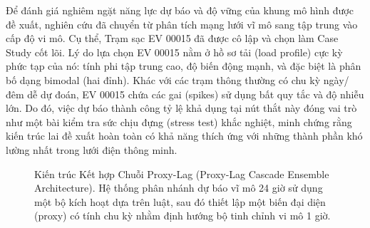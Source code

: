 \documentclass[pdflatex,sn-mathphys-num]{sn-jnl}%
\theoremstyle{thmstyleone}%
\theoremstyle{thmstyletwo}%
\theoremstyle{thmstylethree}%
\begin{document}
Để đánh giá nghiêm ngặt năng lực dự báo và độ vững của khung mô hình được đề xuất, nghiên cứu đã chuyển từ phân tích mạng lưới vĩ mô sang tập trung vào cấp độ vi mô. Cụ thể, Trạm sạc EV 00015 đã được cô lập và chọn làm Case Study cốt lõi. Lý do lựa chọn EV 00015 nằm ở hồ sơ tải (load profile) cực kỳ phức tạp của nó: tính phi tập trung cao, độ biến động mạnh, và đặc biệt là phân bố dạng bimodal (hai đỉnh). Khác với các trạm thông thường có chu kỳ ngày/đêm dễ dự đoán, EV 00015 chứa các gai (spikes) sử dụng bất quy tắc và độ nhiễu lớn. Do đó, việc dự báo thành công tỷ lệ khả dụng tại nút thắt này đóng vai trò như một bài kiểm tra sức chịu đựng (stress test) khắc nghiệt, minh chứng rằng kiến trúc lai đề xuất hoàn toàn có khả năng thích ứng với những thành phần khó lường nhất trong lưới điện thông minh.

\begin{figure}[h]
\centering
{}
\caption{Kiến trúc Kết hợp Chuỗi Proxy-Lag (Proxy-Lag Cascade Ensemble Architecture). Hệ thống phân nhánh dự báo vĩ mô 24 giờ sử dụng một bộ kích hoạt dựa trên luật, sau đó thiết lập một biến đại diện (proxy) có tính chu kỳ nhằm định hướng bộ tinh chỉnh vi mô 1 giờ.}
\label{fig:architecture}
\end{figure}
\end{document}
